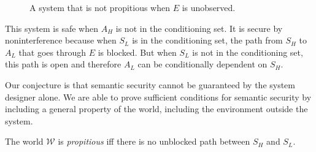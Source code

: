\documentclass[../thesis.tex]{subfiles}
\begin{document}
\begin{figure}
  \label{fig:not-propitious}
\begin{center}
\end{center}
\caption{A system that is not propitious when $E$ is unobserved.}
\end{figure}

This system is safe when $A_H$ is not in the conditioning
set.
It is secure by noninterference because when $S_L$
is in the conditioning set, the path from $S_H$
to $A_L$ that goes through $E$ is blocked.
But when $S_L$ is not in the conditioning set,
this path is open and therefore $A_L$ can
be conditionally dependent on $S_H$. 

%
%
%
%
%
%
%
%

Our conjecture is that semantic security
cannot be guaranteed by the system designer alone.
We are able to prove sufficient conditions for
semantic security by including a general
property of the world, including the
environment outside the system.

\begin{dfn}[Propitious]
  The world $\mathcal{W}$ is \emph{propitious}
  iff there is no unblocked path between
  $S_H$ and $S_L$.
\end{dfn}
\end{document}
